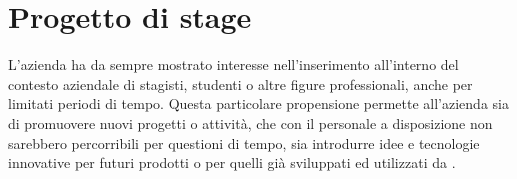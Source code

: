 
\chapter{Progetto di stage}
\label{cap:progetto-stage}

L'azienda \azienda{} ha da sempre mostrato interesse nell'inserimento all'interno del contesto aziendale di stagisti, studenti o altre figure professionali, anche per limitati periodi di tempo. Questa particolare propensione permette all'azienda sia di promuovere nuovi progetti o attività, che con il personale a disposizione non sarebbero percorribili per questioni di tempo, sia introdurre idee e tecnologie innovative per futuri prodotti o per quelli già sviluppati ed utilizzati da \azienda{}.\\ 

